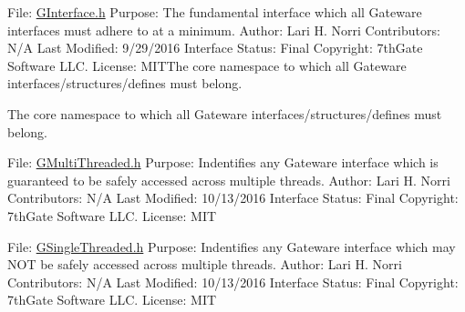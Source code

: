 File\+: \hyperlink{GInterface_8h_source}{G\+Interface.\+h} Purpose\+: The fundamental interface which all Gateware interfaces must adhere to at a minimum. Author\+: Lari H. Norri Contributors\+: N/A Last Modified\+: 9/29/2016 Interface Status\+: Final Copyright\+: 7th\+Gate Software L\+LC. License\+: M\+I\+T\+The core namespace to which all Gateware interfaces/structures/defines must belong.

The core namespace to which all Gateware interfaces/structures/defines must belong.

File\+: \hyperlink{GMultiThreaded_8h_source}{G\+Multi\+Threaded.\+h} Purpose\+: Indentifies any Gateware interface which is guaranteed to be safely accessed across multiple threads. Author\+: Lari H. Norri Contributors\+: N/A Last Modified\+: 10/13/2016 Interface Status\+: Final Copyright\+: 7th\+Gate Software L\+LC. License\+: M\+IT

File\+: \hyperlink{GSingleThreaded_8h_source}{G\+Single\+Threaded.\+h} Purpose\+: Indentifies any Gateware interface which may N\+OT be safely accessed across multiple threads. Author\+: Lari H. Norri Contributors\+: N/A Last Modified\+: 10/13/2016 Interface Status\+: Final Copyright\+: 7th\+Gate Software L\+LC. License\+: M\+IT 